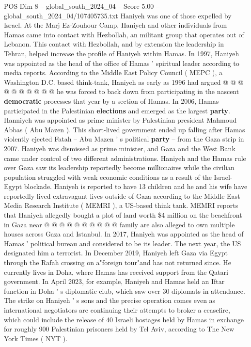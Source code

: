 \begin{textsample}{POS Dim 8 – global\_south\_2024\_04 – Score 5.00 – global\_south\_2024\_04/107405735.txt}
Haniyeh was one of those expelled by Israel.
At the Marj Ez-Zouhour Camp, Haniyeh and other individuals from Hamas came into contact with Hezbollah, an militant group that operates out of Lebanon.
This contact with Hezbollah, and by extension the leadership in Tehran, helped increase the profile of Haniyeh within Hamas.
In 1997, Haniyeh was appointed as the head of the office of Hamas ' spiritual leader according to media reports.
According to the Middle East Policy Council ( MEPC ), a Washington D.C. based think-tank, Haniyeh as early as 1996 had argued @ @ @ @ @ @ @ @ @ @ he was forced to back down from participating in the nascent \textbf{democratic} processes that year by a section of Hamas.
In 2006, Hamas participated in the Palestinian \textbf{elections} and emerged as the largest \textbf{party}.
Hanniyeh was appointed as prime minister by Palestinian president Mahmoud Abbas ( Abu Mazen ).
This short-lived government ended up falling after Hamas violently ejected Fatah -- Abu Mazen ' s political \textbf{party} -- from the Gaza strip in 2007.
Haniyeh was dismissed as prime minister, and Gaza and the West Bank came under control of two different administrations.
Haniyeh and the Hamas rule over Gaza saw its leadership reportedly become millionaires while the civilian population struggled with weak economic conditions as a result of the Israel-Egypt blockade.
Haniyeh is reported to have 13 children and he and his wife have reportedly lived extravagant lives outside of Gaza according to the Middle East Media Research Institute ( MEMRI ), a US-based think tank.
MEMRI reports that Haniyeh allegedly bought a plot of land worth \$4 million on the beachfront in Gaza near @ @ @ @ @ @ @ @ @ @ family are also alleged to own multiple houses across Gaza and Istanbul.
In 2017, Haniyeh was appointed as the head of Hamas ' political bureau and considered to be its leader.
The next year, the US designated him a terrorist.
In December 2019, Haniyeh left Gaza via Egypt through the Rafah crossing on a"foreign tour"and has not returned since.
He currently lives in Doha, where Hamas has received support from the Qatari government.
In April 2023, for example, Haniyeh and Hamas held an Iftar function in Doha ' s diplomatic club, which saw over 30 diplomats in attendance.
The strike on Haniyeh ' s sons and the precise operation comes even as international negotiators are continuing their attempts to broker a ceasefire, which could include the release of 40 Israeli hostages held by Hamas in exchange for roughly 900 Palestinian prisoners held by Tel Aviv, according to The New York Times ( NYT ).

\end{textsample}
